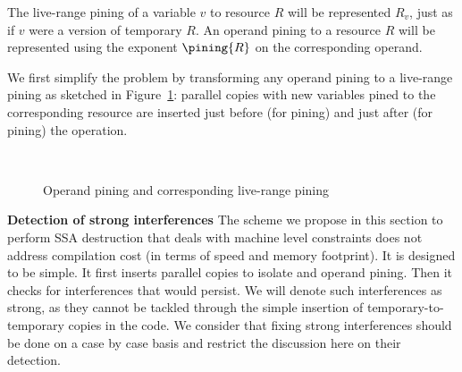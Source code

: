 The live-range pining of a variable $v$ to resource $R$ will be represented $R_v$, just as if $v$ were a version of temporary $R$. An operand pining to a resource $R$ will be represented using the exponent $\pining{R}$ on the corresponding operand. 

We first simplify the problem by transforming any operand pining to a live-range pining as sketched in Figure~\ref{fig:alternative_ssa_destruction:pining}: parallel copies with new variables pined to the corresponding resource are inserted just before (for \useop pining) and just after (for  pining) the operation.

\begin{figure}[h]
\hfill
{}
\\
\hfill
{}
\caption{\label{fig:alternative_ssa_destruction:pining}Operand pining and corresponding live-range pining}
\end{figure}


{\bf Detection of strong interferences}
The scheme we propose in this section to perform SSA destruction that deals with machine level constraints does not address compilation cost (in terms of speed and memory footprint). It is designed to be simple. It first inserts parallel copies to isolate \phifuns and operand pining. Then it checks for interferences that would persist. We will denote such interferences as strong, as they cannot be tackled through the simple insertion of temporary-to-temporary copies in the code. We consider that fixing strong interferences should be done on a case by case basis and restrict the discussion here on their detection.

